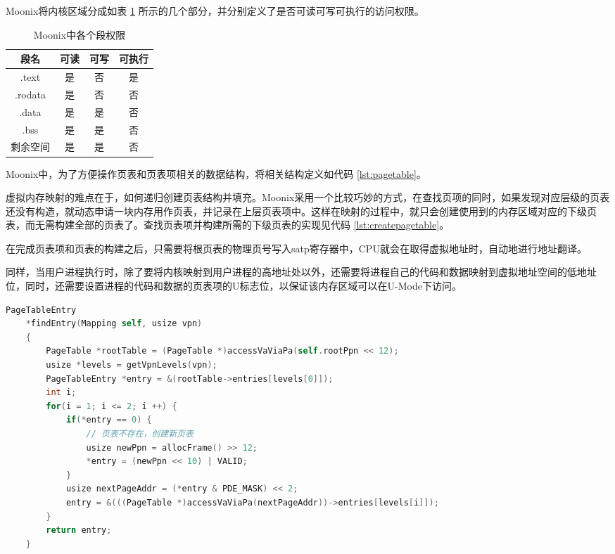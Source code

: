 Moonix将内核区域分成如表 \ref{tab:sectionprivilege} 所示的几个部分，并分别定义了是否可读可写可执行的访问权限。

\begin{table}[h]
	\centering
	\caption{Moonix中各个段权限}
	\label{tab:sectionprivilege}
	\begin{tabular}{|c|c|c|c|}
		\hline
		段名      & 可读 & 可写 & 可执行 \\ \hline
		.text   & 是  & 否  & 是   \\ \hline
		.rodata & 是  & 否  & 否   \\ \hline
		.data   & 是  & 是  & 否   \\ \hline
		.bss    & 是  & 是  & 否   \\ \hline
		剩余空间    & 是  & 是  & 否   \\ \hline
	\end{tabular}
\end{table}

Moonix中，为了方便操作页表和页表项相关的数据结构，将相关结构定义如代码 \ref{lst:pagetable}。

虚拟内存映射的难点在于，如何递归创建页表结构并填充。Moonix采用一个比较巧妙的方式，在查找页项的同时，如果发现对应层级的页表还没有构造，就动态申请一块内存用作页表，并记录在上层页表项中。这样在映射的过程中，就只会创建使用到的内存区域对应的下级页表，而无需构建全部的页表了。查找页表项并构建所需的下级页表的实现见代码 \ref{lst:createpagetable}。

在完成页表项和页表的构建之后，只需要将根页表的物理页号写入satp寄存器中，CPU就会在取得虚拟地址时，自动地进行地址翻译。

同样，当用户进程执行时，除了要将内核映射到用户进程的高地址处以外，还需要将进程自己的代码和数据映射到虚拟地址空间的低地址位，同时，还需要设置进程的代码和数据的页表项的U标志位，以保证该内存区域可以在U-Mode下访问。

\begin{minipage}[c]{0.95\textwidth}
\begin{lstlisting}[language={C}, caption={查找页表项}, label={lst:createpagetable}]
	PageTableEntry
	*findEntry(Mapping self, usize vpn)
	{
		PageTable *rootTable = (PageTable *)accessVaViaPa(self.rootPpn << 12);
		usize *levels = getVpnLevels(vpn);
		PageTableEntry *entry = &(rootTable->entries[levels[0]]);
		int i;
		for(i = 1; i <= 2; i ++) {
			if(*entry == 0) {
				// 页表不存在，创建新页表
				usize newPpn = allocFrame() >> 12;
				*entry = (newPpn << 10) | VALID;
			}
			usize nextPageAddr = (*entry & PDE_MASK) << 2;
			entry = &(((PageTable *)accessVaViaPa(nextPageAddr))->entries[levels[i]]);
		}
		return entry;
	}
\end{lstlisting}
\end{minipage}